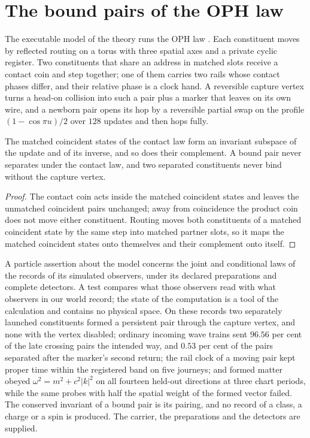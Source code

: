 \section{The bound pairs of the OPH law}
\label{sec:bound-pairs}

The executable model of the theory runs the OPH law \cite{ophmodel}. Each constituent moves by reflected routing on a torus with three
spatial axes and a private cyclic register. Two constituents that share an address in
matched slots receive a contact coin and step together; one of them carries two rails
whose contact phases differ, and their relative phase is a clock hand. A reversible
capture vertex turns a head-on collision into such a pair plus a marker that leaves on its
own wire, and a newborn pair opens its hop by a reversible partial swap on the profile
$(1-\cos\pi u)/2$ over $128$ updates and then hops fully.

\begin{proposition}
\label{prop:law-bound-sector}
The matched coincident states of the contact law form an invariant subspace of the update
and of its inverse, and so does their complement. A bound pair never separates under the
contact law, and two separated constituents never bind without the capture vertex.
\end{proposition}

\begin{proof}
The contact coin acts inside the matched coincident states and leaves the unmatched
coincident pairs unchanged; away from coincidence the product coin does not move either
constituent. Routing moves both constituents of a matched coincident state by the same
step into matched partner slots, so it maps the matched coincident states onto themselves
and their complement onto itself.
\end{proof}

A particle assertion about the model concerns the joint and conditional laws of the
records of its simulated observers, under its declared preparations and complete
detectors. A test compares what those observers read with what observers in our world
record; the state of the computation is a tool of the calculation and contains no
physical space. On these records two separately launched constituents formed a persistent
pair through the capture vertex, and none with the vertex disabled;
ordinary incoming wave trains sent $96.56$ per cent of the late crossing pairs the
intended way, and $0.53$ per cent of the pairs separated after the marker's second return;
the rail clock of a moving pair kept proper time within the registered band on five
journeys; and formed matter obeyed $\omega^2=m^2+c^2|k|^2$ on all fourteen held-out
directions at three chart periods, while the same probes with half the spatial weight of
the formed vector failed. The conserved invariant of a bound pair is its pairing, and no
record of a class, a charge or a spin is produced. The carrier, the preparations and the
detectors are supplied.
